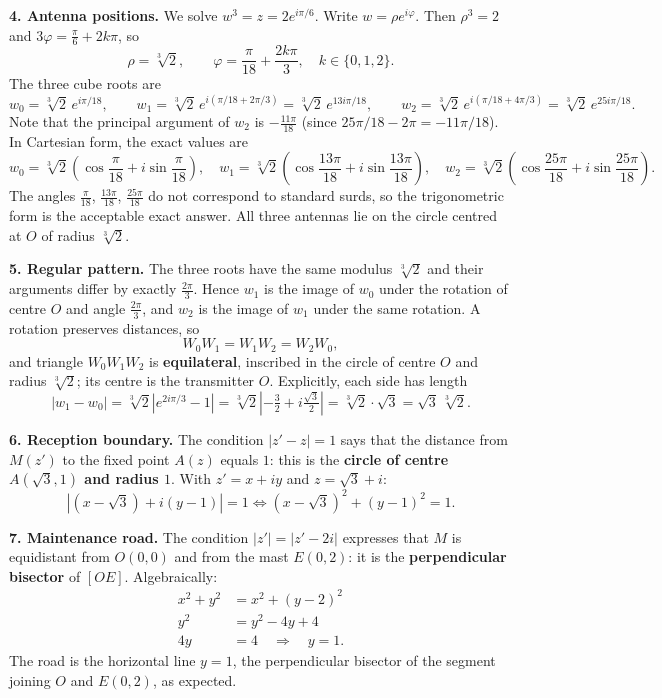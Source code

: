 \documentclass[11pt]{article}
\begin{document}
\textbf{4. Antenna positions.} We solve $w^{3} = z = 2e^{i\pi/6}$. Write $w = \rho e^{i\varphi}$. Then $\rho^{3} = 2$ and $3\varphi = \frac{\pi}{6} + 2k\pi$, so
\[
\rho = \sqrt[3]{2}, \qquad \varphi = \frac{\pi}{18} + \frac{2k\pi}{3}, \quad k \in \{0, 1, 2\}.
\]
The three cube roots are
\[
w_{0} = \sqrt[3]{2}\,e^{i\pi/18}, \qquad
w_{1} = \sqrt[3]{2}\,e^{i(\pi/18 + 2\pi/3)} = \sqrt[3]{2}\,e^{13i\pi/18}, \qquad
w_{2} = \sqrt[3]{2}\,e^{i(\pi/18 + 4\pi/3)} = \sqrt[3]{2}\,e^{25i\pi/18}.
\]
Note that the principal argument of $w_{2}$ is $-\frac{11\pi}{18}$ (since $25\pi/18 - 2\pi = -11\pi/18$). In Cartesian form, the exact values are
\[
w_{0} = \sqrt[3]{2}\left(\cos\frac{\pi}{18} + i\sin\frac{\pi}{18}\right),\quad
w_{1} = \sqrt[3]{2}\left(\cos\frac{13\pi}{18} + i\sin\frac{13\pi}{18}\right),\quad
w_{2} = \sqrt[3]{2}\left(\cos\frac{25\pi}{18} + i\sin\frac{25\pi}{18}\right).
\]
The angles $\frac{\pi}{18}$, $\frac{13\pi}{18}$, $\frac{25\pi}{18}$ do not correspond to standard surds, so the trigonometric form is the acceptable exact answer. All three antennas lie on the circle centred at $O$ of radius $\sqrt[3]{2}$.

\textbf{5. Regular pattern.} The three roots have the same modulus $\sqrt[3]{2}$ and their arguments differ by exactly $\frac{2\pi}{3}$. Hence $w_{1}$ is the image of $w_{0}$ under the rotation of centre $O$ and angle $\frac{2\pi}{3}$, and $w_{2}$ is the image of $w_{1}$ under the same rotation. A rotation preserves distances, so
\[
W_{0}W_{1} = W_{1}W_{2} = W_{2}W_{0},
\]
and triangle $W_{0}W_{1}W_{2}$ is \textbf{equilateral}, inscribed in the circle of centre $O$ and radius $\sqrt[3]{2}$; its centre is the transmitter $O$. Explicitly, each side has length
\[
|w_{1} - w_{0}| = \sqrt[3]{2}\left|e^{2i\pi/3} - 1\right| = \sqrt[3]{2}\left|-\tfrac{3}{2} + i\tfrac{\sqrt{3}}{2}\right| = \sqrt[3]{2}\cdot\sqrt{3} = \sqrt{3}\,\sqrt[3]{2}.
\]

\textbf{6. Reception boundary.} The condition $|z' - z| = 1$ says that the distance from $M(z')$ to the fixed point $A(z)$ equals $1$: this is the \textbf{circle of centre $A(\sqrt{3}, 1)$ and radius $1$}. With $z' = x + iy$ and $z = \sqrt{3} + i$:
\[
|(x - \sqrt{3}) + i(y - 1)| = 1 \iff (x - \sqrt{3})^{2} + (y - 1)^{2} = 1.
\]

\textbf{7. Maintenance road.} The condition $|z'| = |z' - 2i|$ expresses that $M$ is equidistant from $O(0,0)$ and from the mast $E(0, 2)$: it is the \textbf{perpendicular bisector} of $[OE]$. Algebraically:
\begin{align*}
x^{2} + y^{2} &= x^{2} + (y - 2)^{2}\\
y^{2} &= y^{2} - 4y + 4\\
4y &= 4 \quad\Longrightarrow\quad y = 1.
\end{align*}
The road is the horizontal line $y = 1$, the perpendicular bisector of the segment joining $O$ and $E(0,2)$, as expected.
\end{document}
